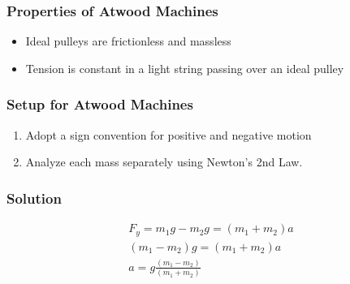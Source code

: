 \documentclass[../Notes.tex]{subfiles}
\begin{document}
\subsubsection{Properties of Atwood Machines}
\begin{itemize}
	\item Ideal pulleys are frictionless and massless
	\item Tension is constant in a light string passing over an ideal pulley
\end{itemize}

\subsubsection{Setup for Atwood Machines}
\begin{enumerate}
	\item Adopt a sign convention for positive and negative motion
	\item Analyze each mass separately using Newton's 2nd Law.
\end{enumerate}

\subsubsection{Solution}
\begin{align*}
F_{y} = m_1 g - m_2 g = (m_1 + m_2)a \\
(m_1 - m_2)g = (m_1 + m_2)a \\
a = g \frac{(m_1 - m_2)}{(m_1 + m_2)}
\end{align*}
\end{document}
